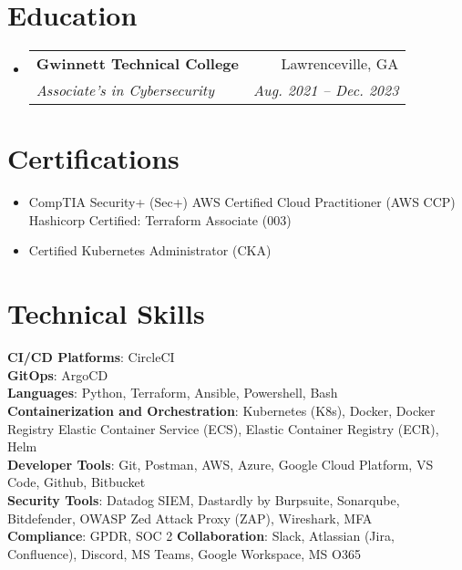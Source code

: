 \documentclass[letterpaper,10pt]{article}
\makeatletter
\newcommand{\resumeItem}[1]{
  \item\small{
    {#1 \vspace{-2pt}}
  }
}
\newcommand{\resumeSubheading}[4]{
  \vspace{-2pt}\item
    \begin{tabular*}{0.97\textwidth}[t]{l@{\extracolsep{\fill}}r}
      \textbf{#1} & #2 \\
      \textit{\small#3} & \textit{\small #4} \\
    \end{tabular*}\vspace{-7pt}
}
\newcommand{\resumeSubItem}[1]{\resumeItem{#1}\vspace{-4pt}}
\newcommand{\resumeSubHeadingListStart}{\begin{itemize}[leftmargin=0.15in, label={}]}
\newcommand{\resumeSubHeadingListEnd}{\end{itemize}}
\makeatother
\begin{document}
\section{Education}
  \resumeSubHeadingListStart
    \resumeSubheading
      {Gwinnett Technical College}{Lawrenceville, GA}
      {Associate's in Cybersecurity}{Aug. 2021 -- Dec. 2023}
  \resumeSubHeadingListEnd

\section{Certifications}
    \resumeSubHeadingListStart
    \resumeSubItem{CompTIA Security+ (Sec+)}
    {AWS Certified Cloud Practitioner (AWS CCP)}
    {Hashicorp Certified: Terraform Associate (003)}
    \resumeSubItem{Certified Kubernetes Administrator (CKA)}
    \resumeSubHeadingListEnd



\section{Technical Skills}
 \begin{itemize}[leftmargin=0.15in, label={}]
    \small{\item{
     \textbf{CI/CD Platforms}{: CircleCI} \\
     \textbf{GitOps}{: ArgoCD} \\
     \textbf{Languages}{: Python, Terraform, Ansible, Powershell, Bash } \\
     \textbf{Containerization and Orchestration}{: Kubernetes (K8s), Docker, Docker Registry  Elastic Container Service (ECS), Elastic Container Registry (ECR), Helm } \\
     \textbf{Developer Tools}{: Git, Postman, AWS, Azure, Google Cloud Platform, VS Code, Github, Bitbucket } \\
     \textbf{Security Tools}{: Datadog SIEM, Dastardly by Burpsuite, Sonarqube, Bitdefender, OWASP Zed Attack Proxy (ZAP), Wireshark, MFA} \\
     \textbf{Compliance}{: GPDR, SOC 2}
     \textbf{Collaboration}{: Slack, Atlassian (Jira, Confluence), Discord, MS Teams, Google Workspace, MS O365}

    }}
 \end{itemize}


\end{document}
